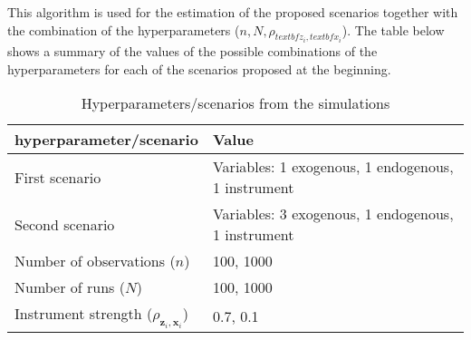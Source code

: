 \documentclass{article}
\begin{document}
\newline
This algorithm is used for the estimation of the proposed scenarios together with the combination of the hyperparameters ($n, N, \rho_{textbf{z}_{i},textbf{x}_{i}}$). The table below shows a summary of the values of the possible combinations of the hyperparameters for each of the scenarios proposed at the beginning.


\begin{table}[h!]
\centering
\begin{tabular}{ | m{12em} | m{7cm}|  } 
  \hline
  hyperparameter/scenario & Value \\ 
  \hline
  First scenario & Variables: 1 exogenous, 1 endogenous, 1 instrument\\ 
  \hline
  Second scenario & Variables: 3 exogenous, 1 endogenous, 1 instrument \\
  \hline
  Number of observations ($n$) & 100, 1000 \\ 
  \hline
  Number of runs ($N$) & 100, 1000 \\ 
  \hline
  Instrument strength ($\rho_{\textbf{z}_{i},\textbf{x}_{i}}$) & 0.7, 0.1 \\ 
  \hline
\end{tabular}
\caption{Hyperparameters/scenarios from the simulations}
\label{table:1}
\end{table}
\end{document}
